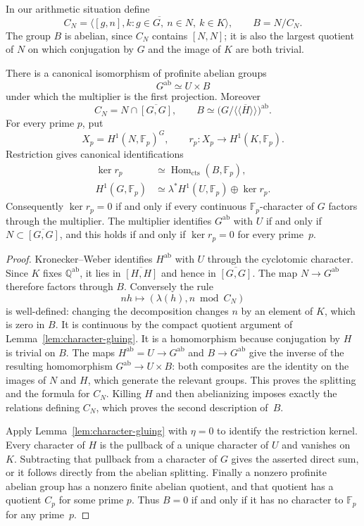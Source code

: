 In our arithmetic situation define
\[
 C_N=\overline{\langle[g,n],k:g\in G,\ n\in N,\ k\in K\rangle},
 \qquad B=N/C_N.
\]
The group $B$ is abelian, since $C_N$ contains $[N,N]$; it is also the
largest quotient of $N$ on which conjugation by $G$ and the image of $K$
are both trivial.

\begin{theorem}\label{thm:abelian-splitting}
There is a canonical isomorphism of profinite abelian groups
\[
 G^{\mathrm{ab}}\simeq U\times B
\]
under which the multiplier is the first projection. Moreover
\[
 C_N=N\cap\overline{[G,G]},\qquad
 B\simeq\bigl(G/\overline{\langle\!\langle H\rangle\!\rangle}\bigr)^{\mathrm{ab}}.
\]
For every prime $p$, put
\[
 X_p=H^1(N,\mathbb F_p)^G,
 \qquad r_p:X_p\longrightarrow H^1(K,\mathbb F_p).
\]
Restriction gives canonical identifications
\begin{align*}
 \ker r_p&\simeq\operatorname{Hom}_{\mathrm{cts}}(B,\mathbb F_p),\\
 H^1(G,\mathbb F_p)&\simeq
 \lambda^*H^1(U,\mathbb F_p)\oplus\ker r_p.
\end{align*}
Consequently $\ker r_p=0$ if and only if every continuous
$\mathbb F_p$-character of $G$ factors through the multiplier.
The multiplier identifies $G^{\mathrm{ab}}$ with $U$ if and only if
$N\subset\overline{[G,G]}$, and this holds if and only if $\ker r_p=0$
for every prime~$p$.
\end{theorem}

\begin{proof}
Kronecker--Weber identifies $H^{\mathrm{ab}}$ with $U$ through the
cyclotomic character. Since $K$ fixes $\mathbb Q^{\mathrm{ab}}$, it lies
in $\overline{[H,H]}$ and hence in $\overline{[G,G]}$.
The map $N\to G^{\mathrm{ab}}$ therefore factors through $B$.
Conversely the rule
\[
 nh\longmapsto(\lambda(h),n\bmod C_N)
\]
is well-defined: changing the decomposition changes $n$ by an element of
$K$, which is zero in $B$. It is continuous by the compact quotient
argument of Lemma~\ref{lem:character-gluing}. It is a homomorphism because
conjugation by $H$ is trivial on $B$. The maps
$H^{\mathrm{ab}}=U\to G^{\mathrm{ab}}$ and $B\to G^{\mathrm{ab}}$
give the inverse of the resulting homomorphism
$G^{\mathrm{ab}}\to U\times B$: both composites are the identity on the
images of $N$ and $H$, which generate the relevant groups.
This proves the splitting and the formula for $C_N$.
Killing $H$ and then abelianizing imposes exactly the relations defining
$C_N$, which proves the second description of~$B$.

Apply Lemma~\ref{lem:character-gluing} with $\eta=0$ to identify the
restriction kernel. Every character of $H$ is the pullback of a unique
character of $U$ and vanishes on $K$. Subtracting that pullback from a
character of $G$ gives the asserted direct sum, or it follows directly
from the abelian splitting. Finally a nonzero profinite abelian group has
a nonzero finite abelian quotient, and that quotient has a quotient
$C_p$ for some prime $p$. Thus $B=0$ if and only if it has no character
to $\mathbb F_p$ for any prime~$p$.
\end{proof}

